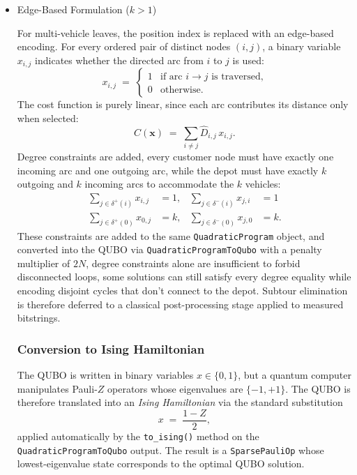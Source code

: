 \documentclass[a4paper]{report}
\begin{document}
{\begin{itemize}
\begin{itemize}
 
\item{Edge-Based Formulation ($k>1$)}
 
For multi-vehicle leaves, the position index is replaced with an
edge-based encoding. For every ordered pair of distinct
nodes $(i,j)$, a binary variable $x_{i,j}$ indicates whether the
directed arc from $i$ to $j$ is used:
\begin{equation}
x_{i,j} \;=\;
\begin{cases}
1 & \text{if arc } i\!\to\! j \text{ is traversed,}\\
0 & \text{otherwise.}
\end{cases}
\end{equation}
The cost function is purely linear, since each arc
contributes its distance only when selected:
\begin{equation}
C(\mathbf{x}) \;=\; \sum_{i\neq j} \hat{D}_{i,j}\, x_{i,j}.
\end{equation}Degree constraints are added, every customer
node must have exactly one incoming arc and one outgoing arc, while the
depot must have exactly $k$ outgoing and $k$ incoming arcs to
accommodate the $k$ vehicles:
\begin{align}
\sum_{j \in \delta^+(i)} x_{i,j} &= 1, &
\sum_{j \in \delta^-(i)} x_{j,i} &= 1
\\
\sum_{j \in \delta^+(0)} x_{0,j} &= k, &
\sum_{j \in \delta^-(0)} x_{j,0} &= k.
\end{align}
These constraints are added to the same \texttt{QuadraticProgram}
object, and converted into the QUBO via
\texttt{QuadraticProgramToQubo} with a penalty multiplier of $2N$, degree
constraints alone are insufficient to forbid disconnected loops, some solutions can still satisfy every degree equality while encoding disjoint cycles that don't connect to the depot. Subtour elimination is therefore deferred to a classical
post-processing stage applied to measured bitstrings.
 
\subsubsection{Conversion to Ising Hamiltonian}
\label{sec:qubo-ising}


The QUBO is written in binary variables $x \in \{0, 1\}$, but a
quantum computer manipulates Pauli-$Z$ operators whose eigenvalues
are $\{-1, +1\}$. The QUBO is therefore translated into an
\emph{Ising Hamiltonian} via the standard substitution
\begin{equation}
x \;=\; \frac{1 - Z}{2},
\end{equation}
applied automatically by the \texttt{to\_ising()} method on the
\texttt{QuadraticProgramToQubo} output. The result is a
\texttt{SparsePauliOp} whose lowest-eigenvalue state corresponds to
the optimal QUBO solution. 


\end{itemize}
\end{itemize}}
\end{document}
